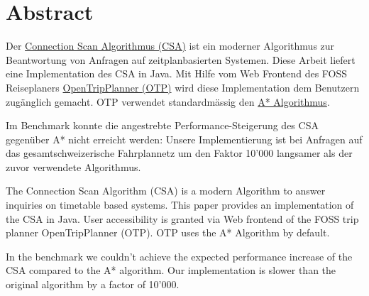 \section{Abstract}
Der \hyperlink{CSA}{Connection Scan Algorithmus (CSA)} ist ein moderner  Algorithmus zur Beantwortung von Anfragen auf zeitplanbasierten Systemen. Diese Arbeit liefert eine Implementation des CSA in Java. Mit Hilfe vom Web Frontend des FOSS Reiseplaners \hyperlink{OTP}{OpenTripPlanner (OTP)} wird diese Implementation dem Benutzern zugänglich gemacht. OTP verwendet standardmässig den \hyperlink{A*}{A* Algorithmus}. \newline

Im Benchmark konnte die angestrebte Performance-Steigerung des CSA gegenüber A* nicht erreicht werden: Unsere Implementierung ist bei Anfragen auf das gesamtschweizerische Fahrplannetz um den Faktor 10'000 langsamer als der zuvor verwendete Algorithmus.

\newpage 

The Connection Scan Algorithm (CSA) is a modern Algorithm to answer inquiries on timetable based systems. This paper provides an implementation of the CSA in Java. User accessibility is granted via Web frontend of the FOSS trip planner OpenTripPlanner (OTP). OTP uses the A* Algorithm by default.\newline

In the benchmark we couldn’t achieve the expected performance increase of the CSA compared to the A* algorithm. Our implementation is slower than the original algorithm by a factor of 10'000.




